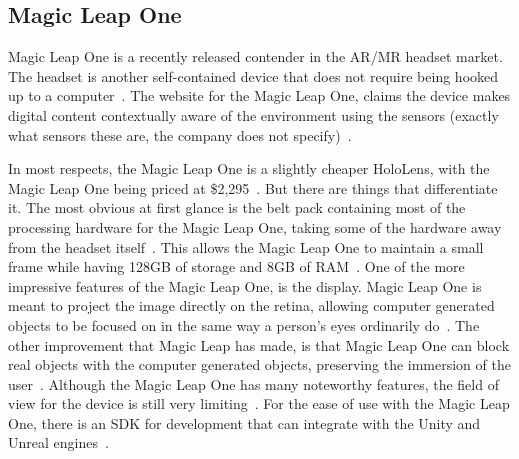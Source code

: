 \documentclass[10pt,draftclsnofoot,onecolumn,letterpaper]{IEEEtran}
\begin{document}
\subsection{Magic Leap One}
Magic Leap One is a recently released contender in the AR/MR headset market. The headset is another self-contained device that does not require being hooked up to a computer~\cite{MLO}. The website for the Magic Leap One, claims the device makes digital content contextually aware of the environment using the sensors (exactly what sensors these are, the company does not specify)~\cite{MLOpromo}.\par
In most respects, the Magic Leap One is a slightly cheaper HoloLens, with the Magic Leap One being priced at \$2,295~\cite{MLOpromo}. But there are things that differentiate it. The most obvious at first glance is the belt pack containing most of the processing hardware for the Magic Leap One, taking some of the hardware away from the headset itself~\cite{MLOpromo}. This allows the Magic Leap One to maintain a small frame while having 128GB of storage and 8GB of RAM~\cite{MLOpromo}. One of the more impressive features of the Magic Leap One, is the display. Magic Leap One is meant to project the image directly on the retina, allowing computer generated objects to be focused on in the same way a person's eyes ordinarily do~\cite{MLO}. The other improvement that Magic Leap has made, is that Magic Leap One can block real objects with the computer generated objects, preserving the immersion of the user~\cite{MLO}. Although the Magic Leap One has many noteworthy features, the field of view for the device is still very limiting~\cite{MLO}. For the ease of use with the Magic Leap One, there is an SDK for development that can integrate with the Unity and Unreal engines~\cite{MLSDK}.\par
\end{document}
